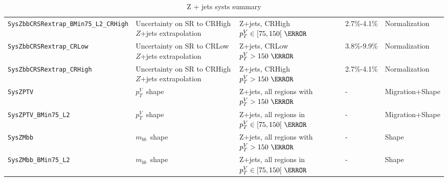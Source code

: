 \begin{table}
{\begin{tabular}{lllll}
      \texttt{SysZbbCRSRextrap\_BMin75\_L2\_CRHigh} & Uncertainty on SR to CRHigh $Z$+jets extrapolation & Z+jets, CRHigh $p_T^V\in[75,150[~\GeV$ & 2.7\%-4.1\% & Normalization\\      
      \texttt{SysZbbCRSRextrap\_CRLow} & Uncertainty on SR to CRLow $Z$+jets extrapolation & Z+jets, CRLow $p_T^V>150~\GeV$ & 3.8\%-9.9\% & Normalization\\
      \texttt{SysZbbCRSRextrap\_CRHigh} & Uncertainty on SR to CRHigh $Z$+jets extrapolation & Z+jets, CRHigh $p_T^V>150~\GeV$ & 2.7\%-4.1\% & Normalization\\         
      \texttt{SysZPTV} & $p_T^V$\ shape & Z+jets, all regions with $p_T^V>150~\GeV$ & - & Migration+Shape \\
      \texttt{SysZPTV\_BMin75\_L2} & $p_T^V$\ shape & Z+jets, all regions in $p_T^V\in[75,150[~\GeV$ & - & Migration+Shape \\
      \texttt{SysZMbb} & $m_{bb}$\ shape & Z+jets, all regions with $p_T^V>150~\GeV$ & - & Shape \\
      \texttt{SysZMbb\_BMin75\_L2} & $m_{bb}$\ shape & Z+jets, all regions in $p_T^V\in[75,150[~\GeV$ & - & Shape \\
      \bottomrule
    \end{tabular}
  }
  \caption{Z + jets systs summary}
  \label{tab:Zjets_systematics}
\end{table}